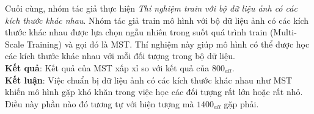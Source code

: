 {    \noindent
    Cuối cùng, nhóm tác giả thực hiện \textit{Thí nghiệm train với bộ dữ liệu ảnh có các kích thước khác nhau}.
    Nhóm tác giả train mô hình với bộ dữ liệu ảnh có các kích thước khác nhau được lựa chọn ngẫu nhiên trong suốt quá trình train (Multi-Scale Training) và gọi đó là MST.
    Thí nghiệm này giúp mô hình có thể được học các kích thước khác nhau với mỗi đối tượng trong bộ dữ liệu. \\
    \textbf{Kết quả}:
    Kết quả của MST xấp xỉ so với kết quả của ${800}_{all}$. \\
    \textbf{Kết luận}:
    Việc chuẩn bị dữ liệu ảnh có các kích thước khác nhau như MST khiến mô hình gặp khó khăn trong việc học các đối tượng rất lớn hoặc rất nhỏ.
    Điều này phần nào đó tương tự với hiện tượng mà ${1400}_{all}$ gặp phải.
}